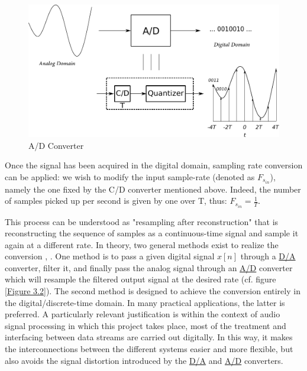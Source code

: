 \begin{figure}[th]
	\centering
	\includegraphics[scale = 0.8]{atod.pdf}
	\decoRule
	\caption{A/D Converter}\label{Figure 3.1}
\end{figure}

\newpage

Once the signal has been acquired in the digital domain, sampling rate conversion can be applied: we wish to modify the input sample-rate (denoted as $ F_{s_{in}} $), namely the one fixed by the C/D converter mentioned above. Indeed, the number of samples picked up per second is given by one over T, thus: $ F_{s_{in}} = \frac{1}{T}$. 

This process can be understood as "resampling after reconstruction" \cite{Proakis} that is reconstructing the sequence of samples as a continuous-time signal and sample it again at a different rate. In theory, two general methods exist to realize the conversion \cite{Proakis}, \cite{Oppenheim}. One method is to pass a given digital signal $x[n]$ %
 through a \hyperlink{D/A}{D/A} converter, filter it, and finally pass the analog signal through an \hyperlink{A/D}{A/D} converter which will resample the filtered output signal at the desired rate (cf. figure \ref{Figure 3.2}). The second method is designed to achieve the conversion entirely in the digital/discrete-time domain. In many practical applications, the latter is preferred. A particularly relevant justification is within the context of audio signal processing in which this project takes place, most of the treatment and interfacing between data streams are carried out digitally. In this way, it makes the interconnections between the different systems easier and more flexible, but also avoids the signal distortion introduced by the \hyperlink{D/A}{D/A} and \hyperlink{A/D}{A/D} converters. 


